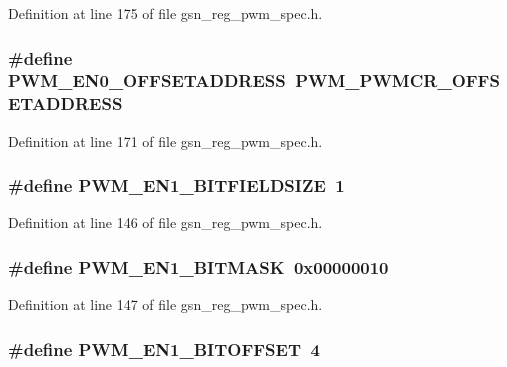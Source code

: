 Definition at line 175 of file gsn\_\-reg\_\-pwm\_\-spec.h.

\hypertarget{a00565_ade5fe532100cb8c66b4abc1f7895aff8}{
\subsubsection[{PWM\_\-EN0\_\-OFFSETADDRESS}]{\setlength{\rightskip}{0pt plus 5cm}\#define PWM\_\-EN0\_\-OFFSETADDRESS~PWM\_\-PWMCR\_\-OFFSETADDRESS}}
\label{a00565_ade5fe532100cb8c66b4abc1f7895aff8}


Definition at line 171 of file gsn\_\-reg\_\-pwm\_\-spec.h.

\hypertarget{a00565_af5bb489f6d7da9acc7f734c170cc4fcc}{
\subsubsection[{PWM\_\-EN1\_\-BITFIELDSIZE}]{\setlength{\rightskip}{0pt plus 5cm}\#define PWM\_\-EN1\_\-BITFIELDSIZE~1}}
\label{a00565_af5bb489f6d7da9acc7f734c170cc4fcc}


Definition at line 146 of file gsn\_\-reg\_\-pwm\_\-spec.h.

\hypertarget{a00565_a0e81085a1468c3225dc12d30d0b2d1c0}{
\subsubsection[{PWM\_\-EN1\_\-BITMASK}]{\setlength{\rightskip}{0pt plus 5cm}\#define PWM\_\-EN1\_\-BITMASK~0x00000010}}
\label{a00565_a0e81085a1468c3225dc12d30d0b2d1c0}


Definition at line 147 of file gsn\_\-reg\_\-pwm\_\-spec.h.

\hypertarget{a00565_a831752a6986c6120f977ff03f2c88b4d}{
\subsubsection[{PWM\_\-EN1\_\-BITOFFSET}]{\setlength{\rightskip}{0pt plus 5cm}\#define PWM\_\-EN1\_\-BITOFFSET~4}}
\label{a00565_a831752a6986c6120f977ff03f2c88b4d}


